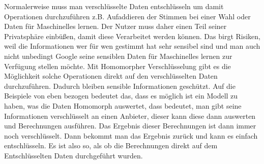 \label{sec:einführung}
Normalerweise muss man verschlüsselte Daten entschlüsseln um damit Operationen 
durchzuführen z.B. Aufaddieren der Stimmen bei einer Wahl oder Daten für Maschinelles 
lernen. Der Nutzer muss daher einen Teil seiner Privatsphäre einbüßen, damit diese 
Verarbeitet werden können. Das birgt Risiken, weil die Informationen wer für wen 
gestimmt hat sehr sensibel sind und man auch nicht unbedingt Google seine sensiblen 
Daten für Maschinelles lernen zur Verfügung stellen möchte. Mit Homomorpher Verschlüsselung 
gibt es die Möglichkeit solche Operationen direkt auf den verschlüsselten Daten durchzuführen. 
Dadurch bleiben sensible Informationen geschützt. Auf die Beispiele von eben bezogen bedeutet 
das, dass es möglich ist ein Modell zu haben, was die Daten Homomorph auswertet, dass bedeutet, 
man gibt seine Informationen verschlüsselt an einen Anbieter, dieser kann diese dann auswerten 
und Berechnungen ausführen. Das Ergebnis dieser Berechnungen ist dann immer noch verschlüsselt. 
Dann bekommt man das Ergebnis zurück und kann es einfach entschlüsseln. Es ist also so, als ob 
die Berechnungen direkt auf dem Entschlüsselten Daten durchgeführt wurden.